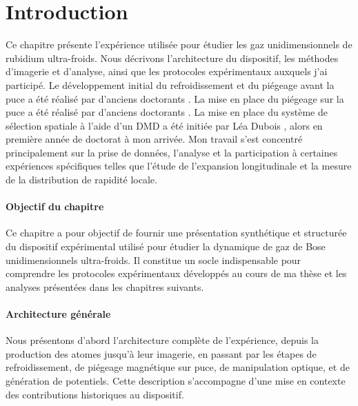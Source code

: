 \section*{Introduction}


Ce chapitre présente l’expérience utilisée pour étudier les gaz unidimensionnels de rubidium ultra-froids. Nous décrivons l’architecture du dispositif, les méthodes d’imagerie et d’analyse, ainsi que les protocoles expérimentaux auxquels j’ai participé. Le développement initial du refroidissement et du piégeage avant la puce a été réalisé par d’anciens doctorants \cite{jacqm2012,Fang2014,Johnson2016} . La mise en place du piégeage sur la puce a été réalisé par d’anciens doctorants \cite{jacqm2012,Fang2014,Johnson2016,schem2019,L.Dubois2024}. La mise en place du système de sélection spatiale à l’aide d’un \gls{DMD}  a été initiée par Léa Dubois \cite{L.Dubois2024}, alors en première année de doctorat à mon arrivée. Mon travail s’est concentré principalement sur la prise de données, l’analyse et la participation à certaines expériences spécifiques telles que l'étude de l’expansion longitudinale et la mesure de la distribution de rapidité locale.



\paragraph{Objectif du chapitre}  
Ce chapitre a pour objectif de fournir une présentation synthétique et structurée du dispositif expérimental utilisé pour étudier la dynamique de gaz de Bose unidimensionnels ultra-froids. Il constitue un socle indispensable pour comprendre les protocoles expérimentaux développés au cours de ma thèse et les analyses présentées dans les chapitres suivants.

\paragraph{Architecture générale}  
Nous présentons d'abord l’architecture complète de l’expérience, depuis la production des atomes jusqu’à leur imagerie, en passant par les étapes de refroidissement, de piégeage magnétique sur puce, de manipulation optique, et de génération de potentiels. Cette description s’accompagne d’une mise en contexte des contributions historiques au dispositif.

